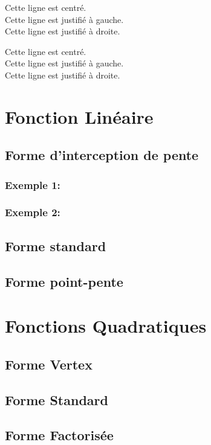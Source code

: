 \documentclass[11pt]{article}
\begin{document}
\vspace{1cm}

\Large
Cette ligne est centré.\\
Cette ligne est justifié à gauche.\\
Cette ligne est justifié à droite.

\vspace{1cm}

\tiny
Cette ligne est centré.\\
Cette ligne est justifié à gauche.\\
Cette ligne est justifié à droite.

\vspace{1cm}



\section{Fonction Linéaire}

	\subsection{Forme d'interception de pente}
	
		\subsubsection{Exemple 1:}
		\subsubsection{Exemple 2:}
	\subsection{Forme standard}
	
	\subsection{Forme point-pente}
	
\section*{Fonctions Quadratiques}

	\subsection{Forme Vertex}
	\subsection{Forme Standard}
	\subsection{Forme Factorisée}
\end{document}
